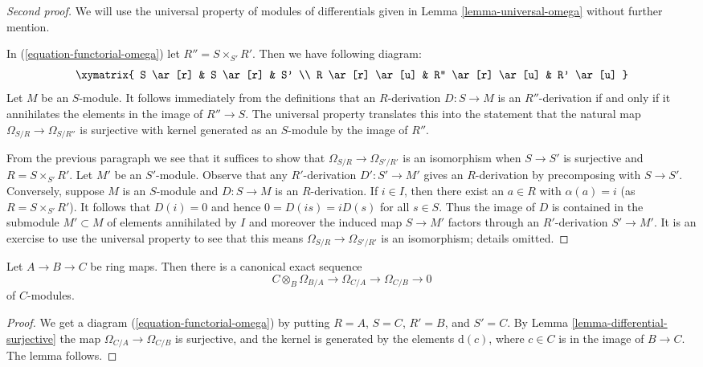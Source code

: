 \begin{proof}[Second proof]
We will use the universal property of modules of differentials
given in Lemma \ref{lemma-universal-omega} without further mention.

\medskip\noindent
In (\ref{equation-functorial-omega}) let $R'' = S \times_{S'} R'$.
Then we have following diagram:
$$
\xymatrix{
S \ar[r] & S \ar[r] & S' \\
R \ar[r] \ar[u] & R'' \ar[r] \ar[u] & R' \ar[u]
}
$$
Let $M$ be an $S$-module. It follows immediately from the definitions that
an $R$-derivation $D : S \to M$ is an $R''$-derivation if and only if
it annihilates the elements in the image of $R'' \to S$. The universal
property translates this into the statement that the natural map
$\Omega_{S/R} \to \Omega_{S/R''}$ is surjective with kernel generated
as an $S$-module by the image of $R''$.

\medskip\noindent
From the previous paragraph we see that it suffices to show that
$\Omega_{S/R} \to \Omega_{S'/R'}$ is an isomorphism
when $S \to S'$ is surjective
and $R = S \times_{S'} R'$. Let $M'$ be an $S'$-module. Observe that any
$R'$-derivation $D' : S' \to M'$ gives an $R$-derivation by precomposing
with $S \to S'$. Conversely, suppose $M$ is an $S$-module and $D : S \to M$
is an $R$-derivation. If $i \in I$, then there exist an $a \in R$ with
$\alpha(a) = i$ (as $R = S \times_{S'} R'$). It follows that $D(i) = 0$
and hence $0 = D(is) = iD(s)$ for all $s \in S$. Thus the image of $D$
is contained in the submodule $M' \subset M$ of elements annihilated by $I$
and moreover the induced map $S \to M'$ factors through an $R'$-derivation
$S' \to M'$. It is an exercise to use the universal property to see that
this means $\Omega_{S/R} \to \Omega_{S'/R'}$ is an isomorphism; details
omitted.
\end{proof}

\begin{lemma}
\label{lemma-exact-sequence-differentials}
Let $A \to B \to C$ be ring maps.
Then there is a canonical exact sequence
$$
C \otimes_B \Omega_{B/A} \to
\Omega_{C/A} \to
\Omega_{C/B} \to 0
$$
of $C$-modules.
\end{lemma}

\begin{proof}
We get a diagram (\ref{equation-functorial-omega}) by putting
$R = A$, $S = C$, $R' = B$, and $S' = C$.
By Lemma \ref{lemma-differential-surjective} the map
$\Omega_{C/A} \to \Omega_{C/B}$ is surjective, and the kernel
is generated by the elements $\text{d}(c)$, where $c \in C$
is in the image of $B \to C$. The lemma follows.
\end{proof}


